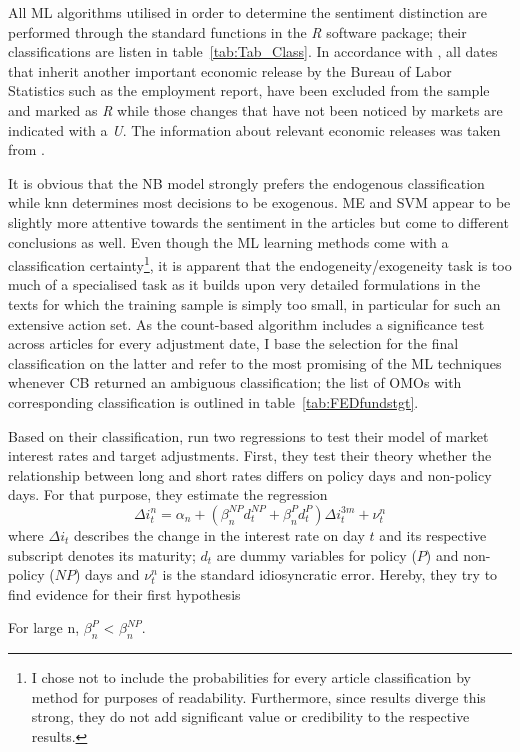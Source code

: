 All ML algorithms utilised in order to determine the sentiment distinction are performed through the standard functions in the \textit{R} software package; their classifications are listen in table~\vref{tab:Tab_Class}. 
In accordance with \textcite{Ellingsen.2003}, all dates that inherit another important economic release by the Bureau of Labor Statistics such as the employment report, have been excluded from the sample and marked as \textit{R} while those changes that have not been noticed by markets are indicated with a \textit{U}. The information about relevant economic releases was taken from \textcite{BoLS.2017}.
%

%
It is obvious that the NB model strongly prefers the endogenous classification while knn determines most decisions to be exogenous. ME and SVM appear to be slightly more attentive towards the sentiment in the articles but come to different conclusions as well. Even though the ML learning methods come with a classification certainty\footnote{I chose not to include the probabilities for every article classification by method for purposes of readability. Furthermore, since results diverge this strong, they do not add significant value or credibility to the respective results.}, it is apparent that the endogeneity/exogeneity task is too much of a specialised task as it builds upon very detailed formulations in the texts for which the training sample is simply too small, in particular for such an extensive action set. As the count-based algorithm includes a significance test across articles for every adjustment date, I base the selection for the final classification on the latter  and refer to the most promising of the ML techniques whenever CB returned an ambiguous classification; the list of OMOs with corresponding classification is outlined in table~\vref{tab:FEDfundstgt}. 

Based on their classification, \textcite{Ellingsen.2003} run two regressions to test their model of market interest rates and target adjustments. First, they test their theory whether the relationship between long and short rates differs on policy days and non-policy days. For that purpose, they estimate the regression
%
\begin{equation}
	\label{eq:PvsNP}
	\Delta i_t^n = \alpha_n + (\beta_n^{NP}d_t^{NP}+\beta_n^{P}d_t^{P})\Delta i_t^{3m}+\nu_t^n
\end{equation}
%
where $\Delta i_t$ describes the change in the interest rate on day $t$ and its respective subscript denotes its maturity; $d_t$ are dummy variables for policy ($P$) and non-policy ($NP$) days and $\nu_t^n$ is the standard idiosyncratic error. Hereby, they try to find evidence for their first hypothesis 
%
\begin{hypothesis}
	\label{H:1}
	For large n, $\beta_n^P$ < $\beta_n^{NP}$.
\end{hypothesis}
%

